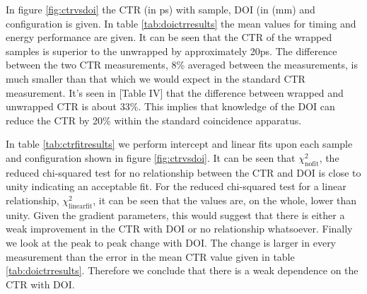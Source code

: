 In figure \ref{fig:ctrvsdoi} the CTR (in ps) with sample, DOI (in (mm) and configuration is given. In table \ref{tab:doictrresults} the mean values for timing and energy performance are given. It can be seen that the CTR of the wrapped samples is superior to the unwrapped by approximately 20ps. The difference between the two CTR measurements, 8\% averaged between the measurements, is much smaller than that which we would expect in the standard CTR measurement. It's seen in [Table IV]\cite{r_Paganoni_Pauwels_et_al__2011} that the difference between wrapped and unwrapped CTR is about 33\%. This implies that knowledge of the DOI can reduce the CTR by 20\% within the standard coincidence apparatus.

In table \ref{tab:ctrfitresults} we perform intercept and linear fits upon each sample and configuration shown in figure \ref{fig:ctrvsdoi}. It can be seen that $\chi^2_\text{nofit}$, the reduced chi-squared test for no relationship between the CTR and DOI is close to unity indicating an acceptable fit. For the reduced chi-squared test for a linear relationship, $\chi^2_\text{linearfit}$, it can be seen that the values are, on the whole, lower than unity. Given the gradient parameters, this would suggest that there is either a weak improvement in the CTR with DOI or no relationship whatsoever. Finally we look at the peak to peak change with DOI. The change is larger in every measurement than the error in the mean CTR value given in table \ref{tab:doictrresults}. Therefore we conclude that there is a weak dependence on the CTR with DOI.